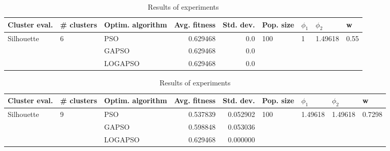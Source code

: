 \documentclass{article}
\begin{document}
\begin{table}
\centering
\caption{Results of experiments}
\begin{tabular}{lllrrllll}
\toprule
              Cluster eval. &        \# clusters & Optim. algorithm &  Avg. fitness &  Std. dev. &            Pop. size &         $\phi_{1}$ &               $\phi_{2}$ &                     w \\
\midrule
\multirow{3}{*}{Silhouette} & \multirow{3}{*}{6} &              PSO &      0.629468 &        0.0 & \multirow{3}{*}{100} & \multirow{3}{*}{1} & \multirow{3}{*}{1.49618} & \multirow{3}{*}{0.55} \\
                            &                    &            GAPSO &      0.629468 &        0.0 &                      &                    &                          &                       \\
                            &                    &          LOGAPSO &      0.629468 &        0.0 &                      &                    &                          &                       \\
\bottomrule
\end{tabular}
\end{table}
\begin{table}
\centering
\caption{Results of experiments}
\begin{tabular}{lllrrllll}
\toprule
              Cluster eval. &        \# clusters & Optim. algorithm &  Avg. fitness &  Std. dev. &            Pop. size &               $\phi_{1}$ &               $\phi_{2}$ &                       w \\
\midrule
\multirow{3}{*}{Silhouette} & \multirow{3}{*}{9} &              PSO &      0.537839 &   0.052902 & \multirow{3}{*}{100} & \multirow{3}{*}{1.49618} & \multirow{3}{*}{1.49618} & \multirow{3}{*}{0.7298} \\
                            &                    &            GAPSO &      0.598848 &   0.053036 &                      &                          &                          &                         \\
                            &                    &          LOGAPSO &      0.629468 &   0.000000 &                      &                          &                          &                         \\
\bottomrule
\end{tabular}
\end{table}
\end{document}
